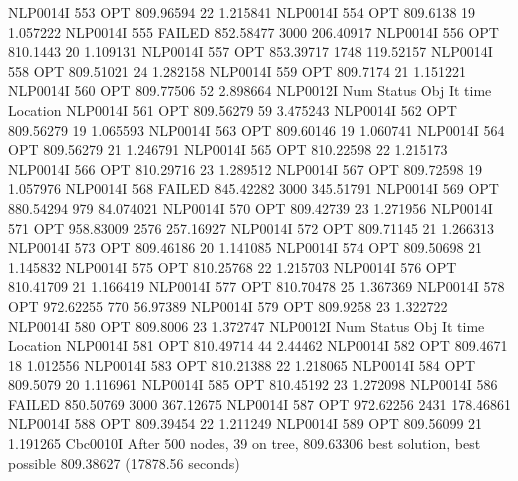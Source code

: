 NLP0014I           553         OPT 809.96594       22 1.215841
NLP0014I           554         OPT 809.6138       19 1.057222
NLP0014I           555      FAILED 852.58477     3000 206.40917
NLP0014I           556         OPT 810.1443       20 1.109131
NLP0014I           557         OPT 853.39717     1748 119.52157
NLP0014I           558         OPT 809.51021       24 1.282158
NLP0014I           559         OPT 809.7174       21 1.151221
NLP0014I           560         OPT 809.77506       52 2.898664
NLP0012I 
              Num      Status      Obj             It       time                 Location
NLP0014I           561         OPT 809.56279       59 3.475243
NLP0014I           562         OPT 809.56279       19 1.065593
NLP0014I           563         OPT 809.60146       19 1.060741
NLP0014I           564         OPT 809.56279       21 1.246791
NLP0014I           565         OPT 810.22598       22 1.215173
NLP0014I           566         OPT 810.29716       23 1.289512
NLP0014I           567         OPT 809.72598       19 1.057976
NLP0014I           568      FAILED 845.42282     3000 345.51791
NLP0014I           569         OPT 880.54294      979 84.074021
NLP0014I           570         OPT 809.42739       23 1.271956
NLP0014I           571         OPT 958.83009     2576 257.16927
NLP0014I           572         OPT 809.71145       21 1.266313
NLP0014I           573         OPT 809.46186       20 1.141085
NLP0014I           574         OPT 809.50698       21 1.145832
NLP0014I           575         OPT 810.25768       22 1.215703
NLP0014I           576         OPT 810.41709       21 1.166419
NLP0014I           577         OPT 810.70478       25 1.367369
NLP0014I           578         OPT 972.62255      770 56.97389
NLP0014I           579         OPT 809.9258       23 1.322722
NLP0014I           580         OPT 809.8006       23 1.372747
NLP0012I 
              Num      Status      Obj             It       time                 Location
NLP0014I           581         OPT 810.49714       44 2.44462
NLP0014I           582         OPT 809.4671       18 1.012556
NLP0014I           583         OPT 810.21388       22 1.218065
NLP0014I           584         OPT 809.5079       20 1.116961
NLP0014I           585         OPT 810.45192       23 1.272098
NLP0014I           586      FAILED 850.50769     3000 367.12675
NLP0014I           587         OPT 972.62256     2431 178.46861
NLP0014I           588         OPT 809.39454       22 1.211249
NLP0014I           589         OPT 809.56099       21 1.191265
Cbc0010I After 500 nodes, 39 on tree, 809.63306 best solution, best possible 809.38627 (17878.56 seconds)
